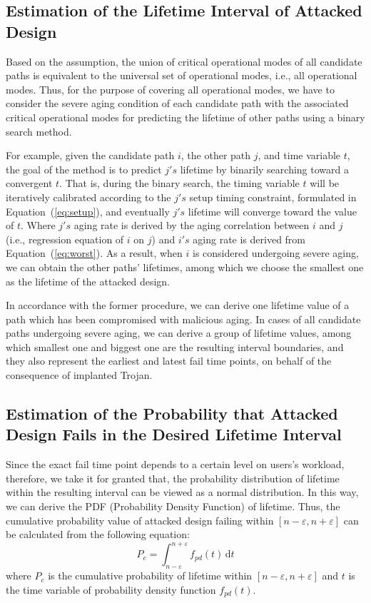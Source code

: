 \subsection{Estimation of the Lifetime Interval of Attacked Design}
Based on the assumption, the union of critical operational modes of all candidate paths is equivalent to the universal set of operational modes, i.e., all operational modes. Thus, for the purpose of covering all operational modes, we have to consider the severe aging condition of each candidate path with the associated critical operational modes for predicting the lifetime of other paths using a binary search method.

For example, given the candidate path $i$, the other path $j$, and time variable $t$, the goal of the method is to predict $j's$ lifetime by binarily searching toward a convergent $t$. That is, during the binary search, the timing variable $t$ will be iteratively calibrated according to the $j's$ setup timing constraint, formulated in Equation~(\ref{eq:setup}), and eventually $j's$ lifetime will converge toward the value of $t$. Where $j's$ aging rate is derived by the aging correlation between $i$ and $j$ (i.e., regression equation of $i$ on $j$) and $i's$ aging rate is derived from Equation~(\ref{eq:worst}). 
As a result, when $i$ is considered undergoing severe aging, we can obtain the other paths' lifetimes, among which we choose the smallest one as the lifetime of the attacked design.

In accordance with the former procedure, we can derive one lifetime value of a path which has been compromised with malicious aging. In cases of all candidate paths undergoing severe aging, we can derive a group of lifetime values, among which smallest one and biggest one are the resulting interval boundaries, and they also represent the earliest and latest fail time points, on behalf of the consequence of implanted Trojan.
\subsection{Estimation of the Probability that Attacked Design Fails in the Desired Lifetime Interval}
Since the exact fail time point depends to a certain level on users's workload, therefore, we take it for granted that, the probability distribution of lifetime within the resulting interval can be viewed as a normal distribution. In this way, we can derive the PDF (Probability Density Function) of lifetime. Thus, the cumulative probability value of attacked design failing within $[n-\varepsilon, n+\varepsilon]$ can be calculated from the following equation:
\begin{equation}
	\label{eq:pdf}
		P_{c} = \int_{n-\varepsilon}^{n+\varepsilon} f_{pd}(t) \,\mathrm{d}t
\end{equation}
where $P_{c}$ is the cumulative probability of lifetime within $[n-\varepsilon, n+\varepsilon]$ and $t$ is the time variable of probability density function $f_{pd}(t)$.

  
